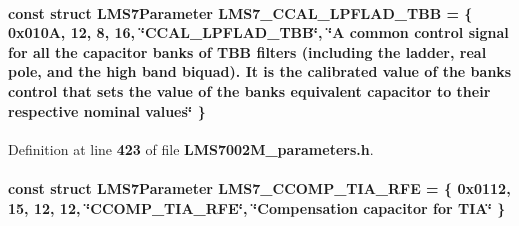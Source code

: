 \paragraph[{L\+M\+S7\+\_\+\+C\+C\+A\+L\+\_\+\+L\+P\+F\+L\+A\+D\+\_\+\+T\+BB}]{\setlength{\rightskip}{0pt plus 5cm}const struct {\bf L\+M\+S7\+Parameter} L\+M\+S7\+\_\+\+C\+C\+A\+L\+\_\+\+L\+P\+F\+L\+A\+D\+\_\+\+T\+BB = \{ 0x010\+A, 12, 8, 16, \char`\"{}\+C\+C\+A\+L\+\_\+\+L\+P\+F\+L\+A\+D\+\_\+\+T\+B\+B\char`\"{}, \char`\"{}\+A common control signal for all the capacitor banks of T\+B\+B filters (including the ladder, real pole, and the high band biquad). It is the calibrated value of the banks control that sets the value of the banks\textquotesingle{} equivalent capacitor to their respective nominal values\char`\"{} \}\hspace{0.3cm}{\ttfamily [static]}}\label{LMS7002M__parameters_8h_a348197bcc973d27ddb6e16487bab2c44}


Definition at line {\bf 423} of file {\bf L\+M\+S7002\+M\+\_\+parameters.\+h}.

\paragraph[{L\+M\+S7\+\_\+\+C\+C\+O\+M\+P\+\_\+\+T\+I\+A\+\_\+\+R\+FE}]{\setlength{\rightskip}{0pt plus 5cm}const struct {\bf L\+M\+S7\+Parameter} L\+M\+S7\+\_\+\+C\+C\+O\+M\+P\+\_\+\+T\+I\+A\+\_\+\+R\+FE = \{ 0x0112, 15, 12, 12, \char`\"{}\+C\+C\+O\+M\+P\+\_\+\+T\+I\+A\+\_\+\+R\+F\+E\char`\"{}, \char`\"{}\+Compensation capacitor for T\+I\+A\char`\"{} \}\hspace{0.3cm}{\ttfamily [static]}}\label{LMS7002M__parameters_8h_a05061f1c85fdc88c7a7a89ceee190b15}



